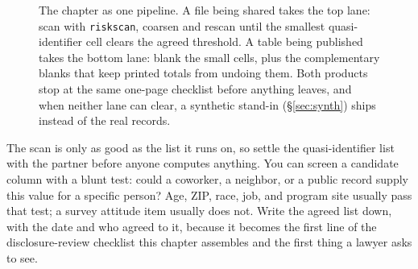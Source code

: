 \begin{figure}[t]
\centering
{}
\caption[The release pipeline this chapter teaches]{The chapter as one pipeline. A file being shared takes the top lane: scan with \texttt{riskscan}, coarsen and rescan until the smallest quasi-identifier cell clears the agreed threshold. A table being published takes the bottom lane: blank the small cells, plus the complementary blanks that keep printed totals from undoing them. Both products stop at the same one-page checklist before anything leaves, and when neither lane can clear, a synthetic stand-in (\S\ref{sec:synth}) ships instead of the real records.}
\label{fig:ch14-viz-pipeline}
\end{figure}


The scan is only as good as the list it runs on, so settle the quasi-identifier list with the partner before anyone computes anything. You can screen a candidate column with a blunt test: could a coworker, a neighbor, or a public record supply this value for a specific person? Age, ZIP, race, job, and program site usually pass that test; a survey attitude item usually does not. Write the agreed list down, with the date and who agreed to it, because it becomes the first line of the disclosure-review checklist this chapter assembles and the first thing a lawyer asks to see.

